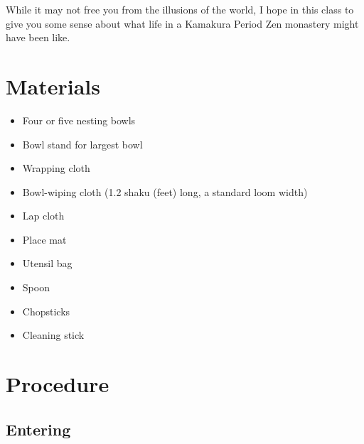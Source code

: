 \documentclass{article}
\begin{document}
\begin{multicols}{2}
While it may not free you from the illusions of the world, I hope
in this class to give you some sense about what life in a Kamakura Period
Zen monastery might have been like.

\section{Materials}

\begin{itemize}
\item Four or five nesting bowls
\item Bowl stand for largest bowl
\item Wrapping cloth
\item Bowl-wiping cloth (1.2 shaku (feet) long, a standard loom width)
\item Lap cloth
\item Place mat
\item Utensil bag
\item Spoon
\item Chopsticks
\item Cleaning stick
\end{itemize}

\section{Procedure}

\subsection{Entering}


\end{multicols}
\end{document}
